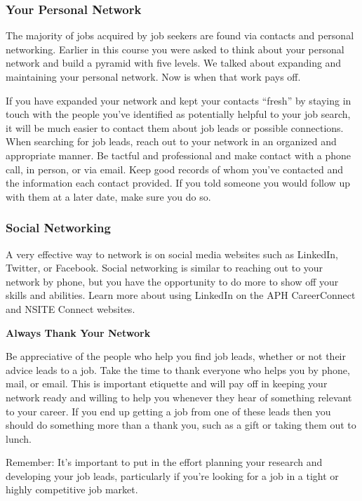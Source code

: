 \subsubsection*{Your Personal Network}
The majority of jobs acquired by job seekers are found via contacts and personal networking. Earlier in this course you were asked to think about your personal network and build a pyramid with five levels. We talked about expanding and maintaining your personal network. Now is when that work pays off.

If you have expanded your network and kept your contacts ``fresh'' by staying in touch with the people you've identified as potentially helpful to your job search, it will be much easier to contact them about job leads or possible connections. When searching for job leads, reach out to your network in an organized and appropriate manner.
Be tactful and professional and make contact with a phone call, in person, or via email.
Keep good records of whom you've contacted and the information each contact provided. If you told someone you would follow up with them at a later date, make sure you do so.

\subsubsection*{Social Networking}

A very effective way to network is on social media websites such as LinkedIn, Twitter, or Facebook. Social networking is similar to reaching out to your network by phone, but you have the opportunity to do more to show off your skills and abilities. Learn more about using LinkedIn on the APH CareerConnect and NSITE Connect websites.

\textbf{Always Thank Your Network}

Be appreciative of the people who help you find job leads, whether or not their advice leads to a job. Take the time to thank everyone who helps you by phone, mail, or email. This is important etiquette and will pay off in keeping your network ready and willing to help you whenever they hear of something relevant to your career. If you end up getting a job from one of these leads then you should do something more than a thank you, such as a gift or taking them out to lunch.

Remember: It's important to put in the effort planning your research and developing your job leads, particularly if you're looking for a job in a tight or highly competitive job market.

